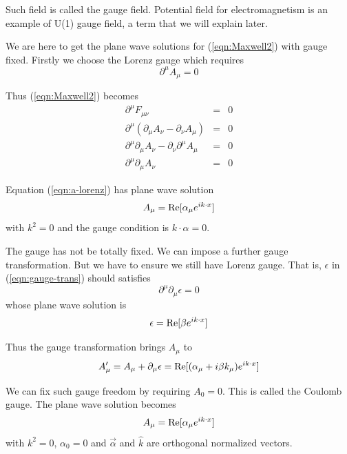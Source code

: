 \documentclass[12pt]{book}
\begin{document}
	Such field is called the gauge field. Potential field for electromagnetism is an example of U(1) gauge field, a term that we will explain later. 
	
	We are here to get the plane wave solutions for (\ref{eqn:Maxwell2}) with gauge fixed. Firstly we choose the Lorenz gauge which requires
	\begin{equation}
		\partial^\mu A_\mu=0
	\end{equation}
	
	Thus (\ref{eqn:Maxwell2}) becomes
	\begin{eqnarray}
		\partial^\mu F_{\mu\nu}&=&0	\\
		\partial^\mu (\partial_\mu A_\nu-\partial_\nu A_\mu)&=&0	\\
		\partial^\mu \partial_\mu A_\nu-\partial_\nu\partial^\mu  A_\mu&=&0	\\
		\partial^\mu \partial_\mu A_\nu&=&0	\label{eqn:a-lorenz}
	\end{eqnarray}
	
	Equation (\ref{eqn:a-lorenz}) has plane wave solution
	\begin{equation}
		A_\mu={\rm Re}[\alpha_\mu e^{ik\cdot x}]
	\end{equation}
	with $k^2=0$ and the gauge condition is $k\cdot \alpha=0$.
		
	The gauge has not be totally fixed. We can impose a further gauge transformation. But we have to ensure we still have Lorenz gauge. That is, $\epsilon$ in (\ref{eqn:gauge-trans}) should satisfies
	\begin{equation}
		\partial^\mu \partial_\mu\epsilon=0
	\end{equation}
	whose plane wave solution is
	\begin{equation}
		\epsilon={\rm Re}[\beta e^{ik\cdot x}]
	\end{equation}
	
	Thus the gauge transformation brings $A_\mu$ to
	\begin{equation}
		A'_\mu=A_\mu+\partial_\mu\epsilon={\rm Re}[(\alpha_\mu+i\beta k_\mu) e^{ik\cdot x}]
	\end{equation}
	
	We can fix such gauge freedom by requiring $A_0=0$. This is called the Coulomb gauge. The plane wave solution becomes
	\begin{equation}
		A_\mu={\rm Re}[\alpha_\mu e^{ik\cdot x}]
	\end{equation}
	with $k^2=0$, $\alpha_0=0$ and $\vec\alpha$ and $\hat k$ are orthogonal normalized vectors.
	
\end{document}
